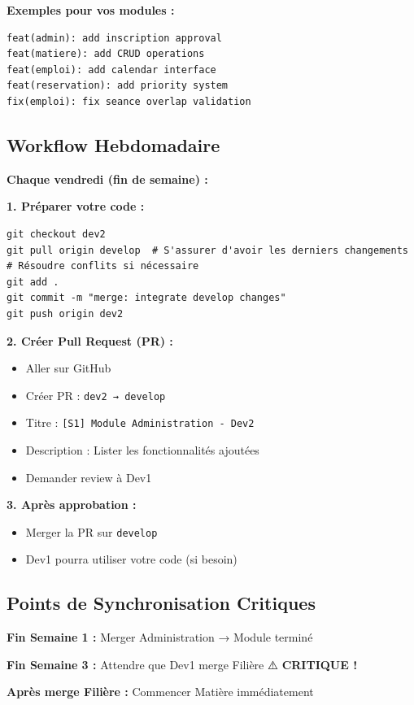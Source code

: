 \documentclass[11pt,a4paper]{article}
\begin{document}
\textbf{Exemples pour vos modules :}
\begin{verbatim}
feat(admin): add inscription approval
feat(matiere): add CRUD operations
feat(emploi): add calendar interface
feat(reservation): add priority system
fix(emploi): fix seance overlap validation
\end{verbatim}

\subsection{Workflow Hebdomadaire}

\textbf{Chaque vendredi (fin de semaine) :}

\textbf{1. Préparer votre code :}
\begin{verbatim}
git checkout dev2
git pull origin develop  # S'assurer d'avoir les derniers changements
# Résoudre conflits si nécessaire
git add .
git commit -m "merge: integrate develop changes"
git push origin dev2
\end{verbatim}

\textbf{2. Créer Pull Request (PR) :}
\begin{itemize}
    \item Aller sur GitHub
    \item Créer PR : \texttt{dev2 → develop}
    \item Titre : \texttt{[S1] Module Administration - Dev2}
    \item Description : Lister les fonctionnalités ajoutées
    \item Demander review à Dev1
\end{itemize}

\textbf{3. Après approbation :}
\begin{itemize}
    \item Merger la PR sur \texttt{develop}
    \item Dev1 pourra utiliser votre code (si besoin)
\end{itemize}

\subsection{Points de Synchronisation Critiques}

\textbf{Fin Semaine 1 :} Merger Administration → Module terminé

\textbf{Fin Semaine 3 :} Attendre que Dev1 merge Filière ⚠️ \textbf{CRITIQUE !}

\textbf{Après merge Filière :} Commencer Matière immédiatement
\end{document}

